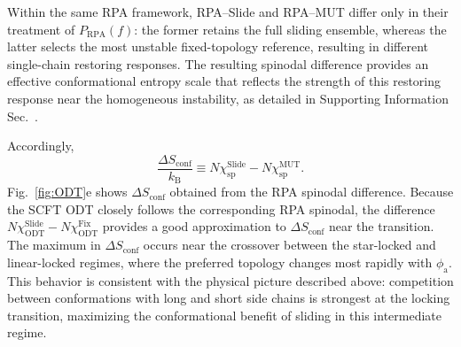 Within the same RPA framework, RPA--Slide and RPA--MUT differ only in their treatment of $P_{\mathrm{RPA}}(f)$: the former retains the full sliding ensemble, whereas the latter selects the most unstable fixed-topology reference, resulting in different single-chain restoring responses.
The resulting spinodal difference provides an effective conformational entropy scale that reflects the strength of this restoring response near the homogeneous instability, as detailed in Supporting Information Sec.~.

Accordingly,
\begin{equation}
    \frac{\Delta S_{\mathrm{conf}}}{k_{\mathrm B}}
    \equiv
    N\chi_{\mathrm{sp}}^{\mathrm{Slide}}
    -
    N\chi_{\mathrm{sp}}^{\mathrm{MUT}}.
\end{equation}
Fig.~\ref{fig:ODT}e shows $\Delta S_{\mathrm{conf}}$ obtained from the RPA spinodal difference.
Because the SCFT ODT closely follows the corresponding RPA spinodal, the difference $N\chi_{\mathrm{ODT}}^{\mathrm{Slide}}-N\chi_{\mathrm{ODT}}^{\mathrm{Fix}}$ provides a good approximation to $\Delta S_{\mathrm{conf}}$ near the transition.
The maximum in $\Delta S_{\mathrm{conf}}$ occurs near the crossover between the star-locked and linear-locked regimes, where the preferred topology changes most rapidly with $\phi_{\mathrm a}$.
This behavior is consistent with the physical picture described above: competition between conformations with long and short side chains is strongest at the locking transition, maximizing the conformational benefit of sliding in this intermediate regime.


